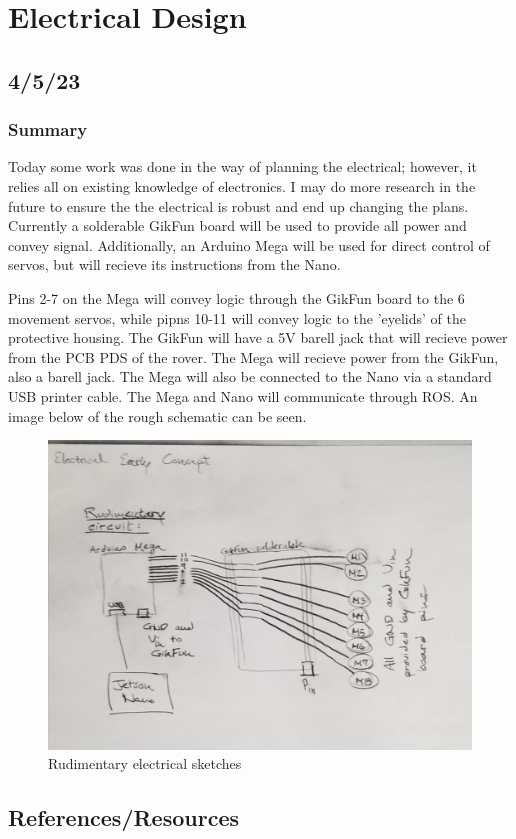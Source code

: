\documentclass[a4paper, 10pt]{article}
\begin{document}
	
\newpage	
	
\section{Electrical Design}
	\subsection{4/5/23}
		\subsubsection{Summary}
		Today some work was done in the way of planning the electrical; however, it relies all on existing knowledge of electronics. I may do more research in the future to ensure the the electrical is robust and end up changing the plans. Currently a solderable GikFun board will be used to provide all power and convey signal. Additionally, an Arduino Mega will be used for direct control of servos, but will recieve its instructions from the Nano. 
		
		Pins 2-7 on the Mega will convey logic through the GikFun board to the 6 movement servos, while pipns 10-11 will convey logic to the 'eyelids' of the protective housing. The GikFun will have a 5V barell jack that will recieve power from the PCB PDS of the rover. The Mega will recieve power from the GikFun, also a barell jack. The Mega will also be connected to the Nano via a standard USB printer cable. The Mega and Nano will communicate through ROS. An image below of the rough schematic can be seen.
		
		\begin{figure} [h]
			\centering
			\includegraphics[scale=0.2]{early_electrical}
			\caption{Rudimentary electrical sketches}
			\label{fig_2}
		\end{figure}
		
	\subsection{References/Resources}
\end{document}
